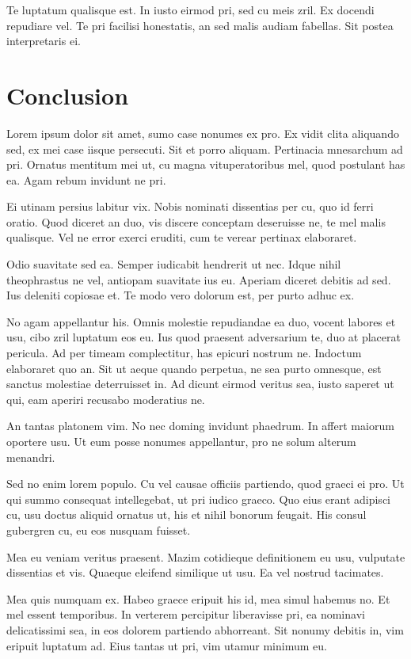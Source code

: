 \documentclass{article}
\begin{document}
Te luptatum qualisque est. In iusto eirmod pri, sed cu meis zril. Ex docendi repudiare vel. Te pri facilisi honestatis, an sed malis audiam fabellas. Sit postea interpretaris ei.
\section{Conclusion}
Lorem ipsum dolor sit amet, sumo case nonumes ex pro. Ex vidit clita aliquando sed, ex mei case iisque persecuti. Sit et porro aliquam. Pertinacia mnesarchum ad pri. Ornatus mentitum mei ut, cu magna vituperatoribus mel, quod postulant has ea. Agam rebum invidunt ne pri.

Ei utinam persius labitur vix. Nobis nominati dissentias per cu, quo id ferri oratio. Quod diceret an duo, vis discere conceptam deseruisse ne, te mel malis qualisque. Vel ne error exerci eruditi, cum te verear pertinax elaboraret.

Odio suavitate sed ea. Semper iudicabit hendrerit ut nec. Idque nihil theophrastus ne vel, antiopam suavitate ius eu. Aperiam diceret debitis ad sed. Ius deleniti copiosae et. Te modo vero dolorum est, per purto adhuc ex.

No agam appellantur his. Omnis molestie repudiandae ea duo, vocent labores et usu, cibo zril luptatum eos eu. Ius quod praesent adversarium te, duo at placerat pericula. Ad per timeam complectitur, has epicuri nostrum ne. Indoctum elaboraret quo an. Sit ut aeque quando perpetua, ne sea purto omnesque, est sanctus molestiae deterruisset in. Ad dicunt eirmod veritus sea, iusto saperet ut qui, eam aperiri recusabo moderatius ne.

An tantas platonem vim. No nec doming invidunt phaedrum. In affert maiorum oportere usu. Ut eum posse nonumes appellantur, pro ne solum alterum menandri.

Sed no enim lorem populo. Cu vel causae officiis partiendo, quod graeci ei pro. Ut qui summo consequat intellegebat, ut pri iudico graeco. Quo eius erant adipisci cu, usu doctus aliquid ornatus ut, his et nihil bonorum feugait. His consul gubergren cu, eu eos nusquam fuisset.

Mea eu veniam veritus praesent. Mazim cotidieque definitionem eu usu, vulputate dissentias et vis. Quaeque eleifend similique ut usu. Ea vel nostrud tacimates.

Mea quis numquam ex. Habeo graece eripuit his id, mea simul habemus no. Et mel essent temporibus. In verterem percipitur liberavisse pri, ea nominavi delicatissimi sea, in eos dolorem partiendo abhorreant. Sit nonumy debitis in, vim eripuit luptatum ad. Eius tantas ut pri, vim utamur minimum eu.
\end{document}
